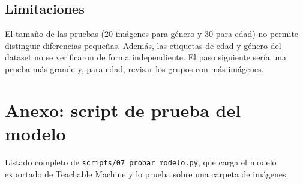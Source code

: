 \documentclass[a4paper,11pt]{article}
\begin{document}
  \subsection{Limitaciones}
  El tamaño de las pruebas (20 imágenes para género y 30 para edad) no permite
  distinguir diferencias pequeñas. Además, las etiquetas de edad y género del
  dataset no se verificaron de forma independiente. El paso siguiente sería una
  prueba más grande y, para edad, revisar los grupos con más imágenes.

  
  

  \appendix
  \section{Anexo: script de prueba del modelo}
  Listado completo de \texttt{scripts/07\_probar\_modelo.py}, que carga el modelo
  exportado de Teachable Machine y lo prueba sobre una carpeta de imágenes.

  
\end{document}
